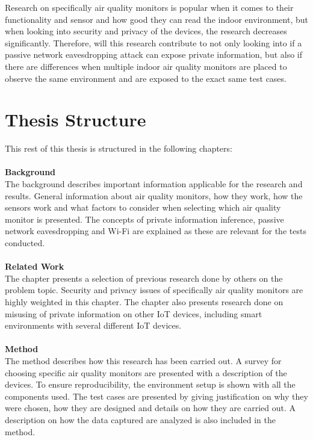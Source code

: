 Research on specifically air quality monitors is popular when it comes to their functionality and sensor and how good they can read the indoor environment, but when looking into security and privacy of the devices, the research decreases significantly. Therefore, will this research contribute to not only looking into if a passive network eavesdropping attack can expose private information, but also if there are differences when multiple indoor air quality monitors are placed to observe the same environment and are exposed to the exact same test cases. 

\section{Thesis Structure}
This rest of this thesis is structured in the following chapters:\\\\
\textbf{Background}
\\
The background describes important information applicable for the research and results. General information about air quality monitors, how they work, how the sensors work and what factors to consider when selecting which air quality monitor is presented. The concepts of private information inference, passive network eavesdropping and \gls{Wi-Fi} are explained as these are relevant for the tests conducted. 
\\\\
\textbf{Related Work}
\\
The chapter presents a selection of previous research done by others on the problem topic. Security and privacy issues of specifically air quality monitors are highly weighted in this chapter. The chapter also presents research done on misusing of private information on other \gls{IoT} devices, including smart environments with several different \gls{IoT} devices. 
\\\\
\textbf{Method}
\\
The method describes how this research has been carried out. A survey for choosing specific air quality monitors are presented with a description of the devices. To ensure reproducibility, the environment setup is shown with all the components used. The test cases are presented by giving justification on why they were chosen, how they are designed and details on how they are carried out. A description on how the data captured are analyzed is also included in the method. 
\\\\
